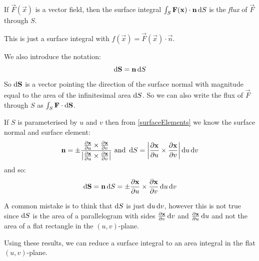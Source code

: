 \documentclass[../main.tex]{subfiles}
\begin{document}
\begin{definition}[Flux]
  If $\vec{F}(\vec{x})$ is a vector field, then the  surface integral $\int_{S} \vec{F}(\vec{x}) \cdot \vec{n} \d{S}$ is the \textit{flux} of $\vec{F}$ through $S$.

  This is just a surface integral with $f(\vec{x}) = \vec{F}(\vec{x}) \cdot \vec{n}$.
\end{definition}
\begin{remark}[Notation]
  \label{vectorSurfaceElement}
  We also introduce the notation:
  \[
    \d{\vec{S}} = \vec{n} \d{S}
  \]
  So $\d{\vec{S}}$ is a vector pointing the direction of the surface normal with magnitude equal to the area of the infinitesimal area $\d{S}$.
  So we can also write the flux of $\vec{F}$ through $S$ as $\int_{S} \vec{F} \cdot \d{\vec{S}}$.
\end{remark}
If $S$ is parameterised by $u$ and $v$ then from \cref{surfaceElements} we know the surface normal and surface element:
\[
  \vec{n} = \pm \frac{\pderiv{\vec{x}}{u} \times \pderiv{\vec{x}}{v}}{\abs{\pderiv{\vec{x}}{u} \times \pderiv{\vec{x}}{v}}} \text{ and } \d{S} = \abs{\pderiv{\vec{x}}{u} \times \pderiv{\vec{x}}{v}} \d{u}\d{v}
\]
and so:
\begin{equation}
  \d{\vec{S}} = \vec{n} \d{S} = \pm \pderiv{\vec{x}}{u} \times \pderiv{\vec{x}}{v} \d{u}\d{v} \label{dSFormula}
\end{equation}
\begin{remark}[Warning]
  A common mistake is to think that $\d{S}$ is just $\d{u} \d{v}$, however this is not true since $\d{S}$ is the area of a parallelogram with sides $\pderiv{\vec{x}}{v} \d{v}$ and $\pderiv{\vec{x}}{u}\d{u}$ and not the area of a flat rectangle in the $(u, v)$-plane.
\end{remark}
Using these results, we can reduce a surface integral to an area integral in the flat $(u, v)$-plane.
\end{document}
